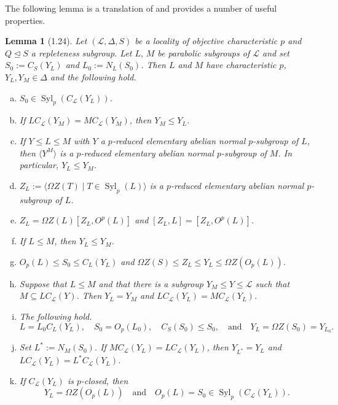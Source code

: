 \documentclass{amsart}
\numberwithin{equation}{section}
\newtheorem{lemma}[equation]{Lemma}
\theoremstyle{definition}
\theoremstyle{subresult}
\theoremstyle{caseresult}
\renewcommand{\L}{\mathcal{L}}
\newcommand{\Syl}{\operatorname{Syl}}
\newcommand{\norm}{\trianglelefteq}
\newcommand{\<}{\langle}
\renewcommand{\>}{\rangle}
\begin{document}
The following lemma is a translation of \cite[Lemma 1.24]{Meier-Stell-Stroth:2012} and provides a number of useful properties. 

\begin{lemma}[1.24] \label{lemma:properties of parabolics in L}
Let $(\L,\Delta,S)$ be a locality of objective characteristic $p$ and $Q \norm S$ a repleteness subgroup. Let $L, \, M$ be parabolic subgroups of $\L$ and set $S_0 := C_S(Y_L)$ and $L_0:= N_L(S_0)$. Then $L$ and $M$ have characteristic $p$, $Y_L, Y_M \in \Delta$ and the following hold.
\begin{enumerate}[(a)]
\item $S_0 \in \Syl_p(C_\L(Y_L))$.
\item If $LC_\L(Y_M) =MC_\L(Y_M)$, then $Y_M \le Y_L$.
\item If $Y \le L \le M$ with $Y$ a $p$-reduced elementary abelian normal $p$-subgroup of $L$, then $\< Y^M \>$ is a $p$-reduced elementary abelian normal $p$-subgroup of $M$. In particular, $Y_L \le Y_M$.
\item $Z_L := \< \Omega Z(T) \mid T \in \Syl_p(L) \>$ is a $p$-reduced elementary abelian normal $p$-subgroup of $L$.
\item $Z_L = \Omega Z(L) [Z_L,O^p(L)]$ and $[Z_L,L] = [Z_L,O^p(L)]$.
\item If $L \le M$, then $Y_L \le Y_M$.
\item $O_p(L) \le S_0 \le C_L(Y_L)$ and $\Omega Z(S) \le Z_L \le Y_L \le \Omega Z(O_p(L))$.
\item Suppose that $L \le M$ and that there is a subgroup $Y_M \le Y \le \L$ such that $M \subseteq LC_\L(Y)$. Then $Y_L =Y_M$ and $LC_\L(Y_L) = MC_\L(Y_L)$.
\item The following hold.
\[
L=L_0 C_L(Y_L), \quad S_0 = O_p(L_0), \quad C_S(S_0)\le S_0, \quad \text{and} \quad Y_L=\Omega Z(S_0) =Y_{L_0}.
\]
\item Set $L^* := N_M(S_0)$. If $MC_\L(Y_L) = LC_\L(Y_L)$, then $Y_{L^*} = Y_L$ and $LC_\L(Y_L) = L^*C_\L(Y_L)$.
\item If $C_\L(Y_L)$ is $p$-closed, then
\[
Y_L = \Omega Z(O_p(L)) \quad \text{and} \quad O_p(L) = S_0 \in \Syl_p(C_\L(Y_L)).
\]
\end{enumerate}
\end{lemma}
\end{document}
